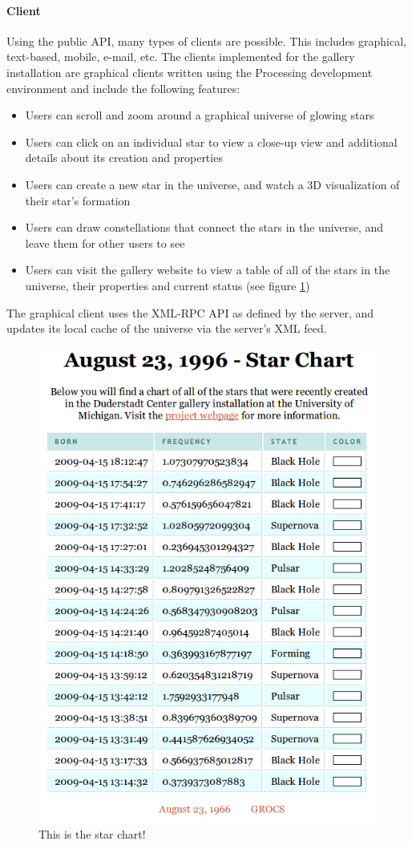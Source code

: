 \paragraph{Client}
Using the public API, many types of clients are possible. This includes graphical, text-based, mobile, e-mail, etc. The clients implemented for the gallery installation are graphical clients written using the Processing development environment and include the following features:
\begin{itemize}
\item Users can scroll and zoom around a graphical universe of glowing stars
\item Users can click on an individual star to view a close-up view and additional details about its creation and properties
\item Users can create a new star in the universe, and watch a 3D visualization of their star's formation
\item Users can draw constellations that connect the stars in the universe, and leave them for other users to see
\item Users can visit the gallery website to view a table of all of the stars in the universe, their properties and current status (see figure \ref{fig:starchart})
\end{itemize}
The graphical client uses the XML-RPC API as defined by the server, and updates its local cache of the universe via the server's XML feed.
\begin{figure}[htp]\centering
  \includegraphics[width=.4\textwidth]{images/starchart.png}
  \caption{This is the star chart!}\label{fig:starchart}
\end{figure}
